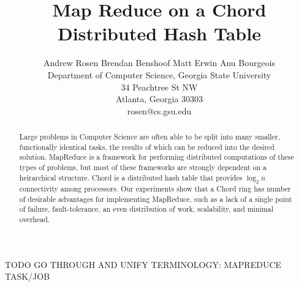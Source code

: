 \documentclass[conference, compsocconf, letterpaper]{IEEEtran}
\title{Map Reduce on a Chord Distributed Hash Table}
\author{
Andrew Rosen \qquad Brendan Benshoof \qquad Matt Erwin \qquad Anu Bourgeois  \\Department of Computer Science, Georgia State University\\ 34 Peachtree St NW \\ Atlanta, Georgia 30303\\  rosen@cs.gsu.edu }
\begin{document}
\maketitle

\begin{abstract}

Large problems in Computer Science are often able to be split into many smaller, functionally identical tasks, the results of which can be reduced into the desired solution.  MapReduce is a framework for 
performing distributed computations of these types of problems, but most of these frameworks are strongly dependent on a heirarchical structure.  Chord is a distributed hash table that provides $\log_{2}n$ connectivity among processors.  Our experiments show that a Chord ring has number of desirable advantages for implementing MapReduce, such as a lack of a single point of failure, fault-tolerance, an even distribution of work, scalability, and minimal overhead.


\end{abstract}

TODO GO THROUGH AND UNIFY TERMINOLOGY:  MAPREDUCE TASK/JOB
\end{document}
